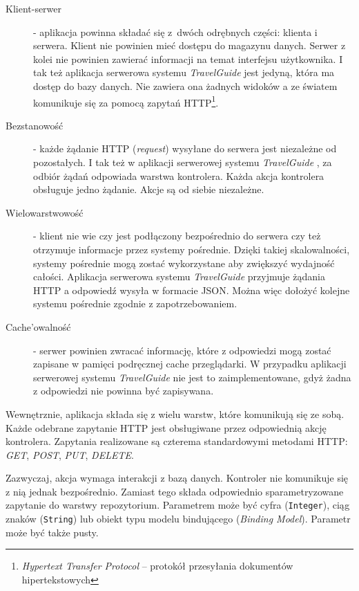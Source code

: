 \documentclass{book}
\newcommand{\appName}{\emph{TravelGuide} }
\begin{document}
			\begin{description}
				
				\item[Klient-serwer] -  aplikacja powinna składać się z~dwóch odrębnych części: klienta i serwera. Klient nie powinien mieć dostępu do magazynu danych. Serwer z kolei nie powinien zawierać informacji na temat interfejsu użytkownika. I tak też aplikacja serwerowa systemu \appName jest jedyną, która ma dostęp do bazy danych. Nie zawiera ona żadnych widoków a ze światem  %
 				komunikuje się za pomocą zapytań HTTP\footnote{\emph{Hypertext Transfer Protocol} – protokół przesyłania dokumentów hipertekstowych}.
				\item[Bezstanowość] - każde żądanie HTTP (\emph{request}) wysyłane do serwera jest niezależne od pozostałych. I tak też w aplikacji serwerowej systemu \appName, za odbiór żądań odpowiada warstwa kontrolera. Każda akcja kontrolera obsługuje jedno żądanie. Akcje są od siebie niezależne.
				\item[Wielowarstwowość] - klient nie wie\ksremark{,} czy jest podłączony bezpośrednio do serwera\ksremark{,} czy też otrzymuje informacje przez systemy pośrednie. Dzięki takiej skalowalności, systemy pośrednie mogą zostać wykorzystane\ksremark{,} aby zwiększyć wydajność całości. Aplikacja serwerowa systemu \appName przyjmuje żądania HTTP a odpowiedź wysyła w formacie JSON. Można więc dołożyć kolejne systemu pośrednie zgodnie z zapotrzebowaniem. 
				\item[Cache'owalność] -  %
				serwer powinien zwracać informację, które z odpowiedzi mogą zostać zapisane w pamięci podręcznej cache przeglądarki. W przypadku aplikacji serwerowej systemu \appName nie jest to zaimplementowane, gdyż żadna z odpowiedzi nie powinna być zapisywana.
				
			\end{description}
			
			Wewnętrznie, aplikacja składa się z wielu warstw, które komunikują się ze sobą. Każde odebrane zapytanie HTTP jest obsługiwane przez odpowiednią akcję kontrolera. Zapytania realizowane są czterema standardowymi metodami HTTP: \emph{GET}, \emph{POST}, \emph{PUT}, \emph{DELETE}.
			
			Zazwyczaj, akcja wymaga interakcji z bazą danych. Kontroler nie komunikuje się z nią jednak bezpośrednio. Zamiast tego składa odpowiednio sparametryzowane zapytanie do warstwy repozytorium. Parametrem może być cyfra (\texttt{Integer}), ciąg znaków (\texttt{String}) lub obiekt typu modelu bindującego (\emph{Binding Model}). Parametr może być także pusty. 
			
\end{document}
